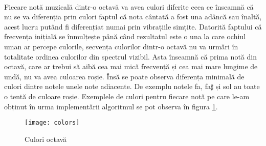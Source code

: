 \documentclass[../IoMusT.tex]{subfiles}
\begin{document}
\\
\par Fiecare notă muzicală dintr-o octavă va avea culori diferite ceea ce înseamnă că nu se va diferenția prin culori faptul că nota cântată a fost una adâncă sau înaltă, acest lucru putând fi diferențiat numai prin vibrațiile simțite. Datorită faptului că frecvența inițială se înmulțește până când rezultatul este o una la care ochiul uman ar percepe culorile, secvența culorilor dintr-o octavă nu va urmări în totalitate ordinea culorilor din spectrul vizibil. Asta înseamnă că prima notă din octavă, care ar trebui să aibă cea mai mică frecvență și cea mai mare lungime de undă, nu va avea culoarea roșie. Însă se poate observa diferența minimală de culori dintre notele unele note adiacente. De exemplu notele fa, fa$\sharp$ și sol au toate o tentă de culoare roșie. Exemplele de culori pentru fiecare notă pe care le-am obținut în urma implementării algoritmul se pot observa în figura \ref{fig:colors}.
\begin{figure}[h]
\centering
\texttt{[image: colors]}
\caption{Culori octavă}
\label{fig:colors}
\end{figure} 
\end{document}
